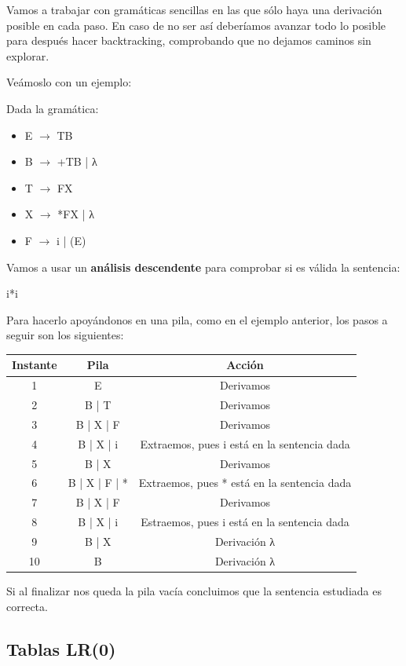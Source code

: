 \documentclass{apuntes}
\begin{document}
Vamos a trabajar con gramáticas sencillas en las que sólo haya una derivación posible en cada paso. En caso de no ser así deberíamos avanzar todo lo posible para después hacer backtracking, comprobando que no dejamos caminos sin explorar.

Veámoslo con un ejemplo:
\begin{example}
Dada la gramática:
\begin{itemize}
\item E $\rightarrow$ TB
\item B $\rightarrow$ +TB | λ
\item T $\rightarrow$ FX
\item X $\rightarrow$ *FX | λ
\item F $\rightarrow$ i | (E)
\end{itemize}
Vamos a usar un \textbf{análisis descendente} para comprobar si es válida la sentencia:
\begin{center}
i*i
\end{center}
Para hacerlo apoyándonos en una pila, como en el ejemplo anterior, los pasos a seguir son los siguientes:

\begin{tabular}{| c | c | c |}
\hline
Instante & Pila & Acción\\
\hline
1 & E & Derivamos\\
\hline
2 & B | T & Derivamos \\
\hline
3 & B | X | F & Derivamos\\
\hline
4 & B | X | i & Extraemos, pues i está en la sentencia dada\\
\hline
5 & B | X & Derivamos \\
\hline
6 & B | X | F | * & Extraemos, pues * está en la sentencia dada \\
\hline
7 & B | X | F & Derivamos \\
\hline
8 & B | X | i & Estraemos, pues i está en la sentencia dada \\
\hline
9 & B | X & Derivación λ\\
\hline
10 & B & Derivación λ \\
\hline
\end{tabular}

Si al finalizar nos queda la pila vacía concluimos que la sentencia estudiada es correcta.
\end{example}

\subsection{Tablas LR(0)}
\end{document}
